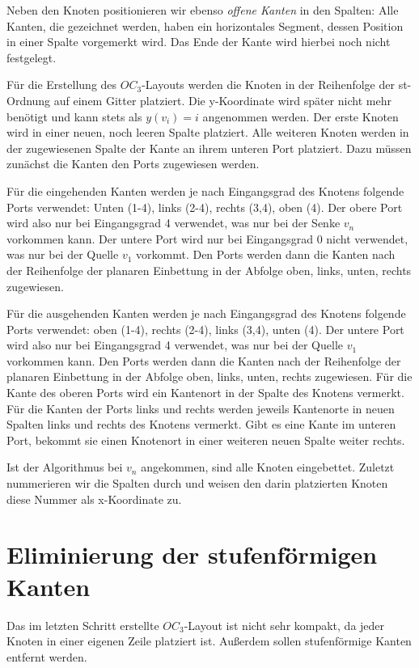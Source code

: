 \documentclass[a4paper]{scrreprt}
\theoremstyle{definition}
\begin{document}
Neben den Knoten positionieren wir ebenso \emph{offene Kanten} in den Spalten: Alle Kanten, die gezeichnet werden, haben ein horizontales Segment, dessen Position in einer Spalte vorgemerkt wird. Das Ende der Kante wird hierbei noch nicht festgelegt. %

Für die Erstellung des $OC_3$-Layouts werden die Knoten in der Reihenfolge der st-Ordnung auf einem Gitter platziert. Die y-Koordinate wird später nicht mehr benötigt und kann stets als $y(v_i) = i$ angenommen werden. Der erste Knoten wird in einer neuen, noch leeren Spalte platziert. Alle weiteren Knoten werden in der zugewiesenen Spalte der Kante an ihrem unteren Port platziert. Dazu müssen zunächst die Kanten den Ports zugewiesen werden.

Für die eingehenden Kanten werden je nach Eingangsgrad des Knotens folgende Ports verwendet: Unten (1-4), links (2-4), rechts (3,4), oben (4). Der obere Port wird also nur bei Eingangsgrad 4 verwendet, was nur bei der Senke $v_n$ vorkommen kann. Der untere Port wird nur bei Eingangsgrad 0 nicht verwendet, was nur bei der Quelle $v_1$ vorkommt. Den Ports werden dann die Kanten nach der Reihenfolge der planaren Einbettung in der Abfolge oben, links, unten, rechts zugewiesen.

Für die ausgehenden Kanten werden je nach Eingangsgrad des Knotens folgende Ports verwendet: oben (1-4), rechts (2-4), links (3,4), unten (4). Der untere Port wird also nur bei Eingangsgrad 4 verwendet, was nur bei der Quelle $v_1$ vorkommen kann. Den Ports werden dann die Kanten nach der Reihenfolge der planaren Einbettung in der Abfolge oben, links, unten, rechts zugewiesen. 
Für die Kante des oberen Ports wird ein Kantenort in der Spalte des Knotens vermerkt. Für die Kanten der Ports links und rechts werden jeweils Kantenorte in neuen Spalten links und rechts des Knotens vermerkt. Gibt es eine Kante im unteren Port, bekommt sie einen Knotenort in einer weiteren neuen Spalte weiter rechts. %

Ist der Algorithmus bei $v_n$ angekommen, sind alle Knoten eingebettet. Zuletzt nummerieren wir die Spalten durch und weisen den darin platzierten Knoten diese Nummer als x-Koordinate zu. 

\section{Eliminierung der stufenförmigen Kanten}

Das im letzten Schritt erstellte $OC_3$-Layout ist nicht sehr kompakt, da jeder Knoten in einer eigenen Zeile platziert ist. Außerdem sollen stufenförmige Kanten entfernt werden.
\end{document}
